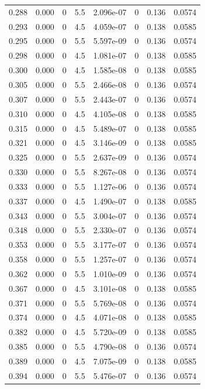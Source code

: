 \documentclass[preview]{standalone}
\begin{document}
{{{\begin{tabular}{L{1.2cm}C{1.2cm} C{0.3cm}C{0.5cm} C{1.4cm}C{1.4cm} C{1.4cm}C{1.4cm}}
  0.288  &  0.000  & 0     & 5.5 &  2.096e-07  & 0  & 0.136 &  0.0574   \\ 
  0.293  &  0.000  & 0     & 4.5 &  4.059e-07  & 0  & 0.138 &  0.0585   \\ 
  0.295  &  0.000  & 0     & 5.5 &  5.597e-09  & 0  & 0.136 &  0.0574   \\ 
  0.298  &  0.000  & 0     & 4.5 &  1.081e-07  & 0  & 0.138 &  0.0585   \\ 
  0.300  &  0.000  & 0     & 4.5 &  1.585e-08  & 0  & 0.138 &  0.0585   \\ 
  0.305  &  0.000  & 0     & 5.5 &  2.466e-08  & 0  & 0.136 &  0.0574   \\ 
  0.307  &  0.000  & 0     & 5.5 &  2.443e-07  & 0  & 0.136 &  0.0574   \\ 
  0.310  &  0.000  & 0     & 4.5 &  4.105e-08  & 0  & 0.138 &  0.0585   \\ 
  0.315  &  0.000  & 0     & 4.5 &  5.489e-07  & 0  & 0.138 &  0.0585   \\ 
  0.321  &  0.000  & 0     & 4.5 &  3.146e-09  & 0  & 0.138 &  0.0585   \\ 
  0.325  &  0.000  & 0     & 5.5 &  2.637e-09  & 0  & 0.136 &  0.0574   \\ 
  0.330  &  0.000  & 0     & 5.5 &  8.267e-08  & 0  & 0.136 &  0.0574   \\ 
  0.333  &  0.000  & 0     & 5.5 &  1.127e-06  & 0  & 0.136 &  0.0574   \\ 
  0.337  &  0.000  & 0     & 4.5 &  1.490e-07  & 0  & 0.138 &  0.0585   \\ 
  0.343  &  0.000  & 0     & 5.5 &  3.004e-07  & 0  & 0.136 &  0.0574   \\ 
  0.348  &  0.000  & 0     & 5.5 &  2.330e-07  & 0  & 0.136 &  0.0574   \\ 
  0.353  &  0.000  & 0     & 5.5 &  3.177e-07  & 0  & 0.136 &  0.0574   \\ 
  0.358  &  0.000  & 0     & 5.5 &  1.257e-07  & 0  & 0.136 &  0.0574   \\ 
  0.362  &  0.000  & 0     & 5.5 &  1.010e-09  & 0  & 0.136 &  0.0574   \\ 
  0.367  &  0.000  & 0     & 4.5 &  3.101e-08  & 0  & 0.138 &  0.0585   \\ 
  0.371  &  0.000  & 0     & 5.5 &  5.769e-08  & 0  & 0.136 &  0.0574   \\ 
  0.374  &  0.000  & 0     & 4.5 &  4.071e-08  & 0  & 0.138 &  0.0585   \\ 
  0.382  &  0.000  & 0     & 4.5 &  5.720e-09  & 0  & 0.138 &  0.0585   \\ 
  0.385  &  0.000  & 0     & 5.5 &  4.790e-08  & 0  & 0.136 &  0.0574   \\ 
  0.389  &  0.000  & 0     & 4.5 &  7.075e-09  & 0  & 0.138 &  0.0585   \\ 
  0.394  &  0.000  & 0     & 5.5 &  5.476e-07  & 0  & 0.136 &  0.0574   \\ 
\hline 
\end{tabular} 

}}}
\end{document}
